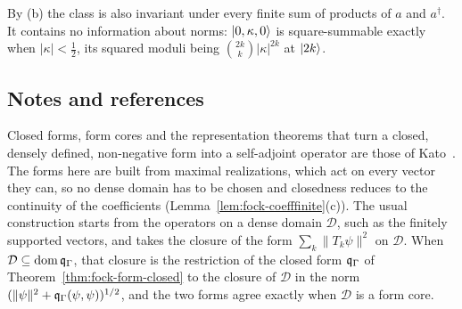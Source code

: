 \begin{vetbenv}
By (b) the class is also invariant under every finite sum of products of $a$ and $a^\dagger$. It
contains no information about norms: $\lvert 0,\kappa,0\rangle$ is square-summable exactly when
$\lvert\kappa\rvert<\tfrac12$, its squared moduli being $\binom{2k}{k}\lvert\kappa\rvert^{2k}$ at $\lvert 2k\rangle$.

\subsection*{Notes and references}

Closed forms, form cores and the representation theorems that turn a closed, densely defined,
non-negative form into a self-adjoint operator are those of Kato~\cite[VI\,\S\S1--2]{kato}. The forms here
are built from maximal realizations, which act on every vector they can, so no dense domain has to be
chosen and closedness reduces to the continuity of the coefficients (Lemma~\ref{lem:fock-coefffinite}(c)).
The usual construction starts from the operators on a dense domain $\mathcal D$, such as the finitely
supported vectors, and takes the closure of the form $\sum_k\lVert T_k\psi\rVert^2$ on $\mathcal D$. When
$\mathcal D\subseteq\operatorname{dom}\mathfrak q_\Gamma$, that closure is the restriction of the closed form $\mathfrak q_\Gamma$ of
Theorem~\ref{thm:fock-form-closed} to the closure of $\mathcal D$ in the norm $(\lVert\psi\rVert^2+
\mathfrak q_\Gamma(\psi,\psi))^{1/2}$, and the two forms agree exactly when $\mathcal D$ is a form core.
\end{vetbenv}
